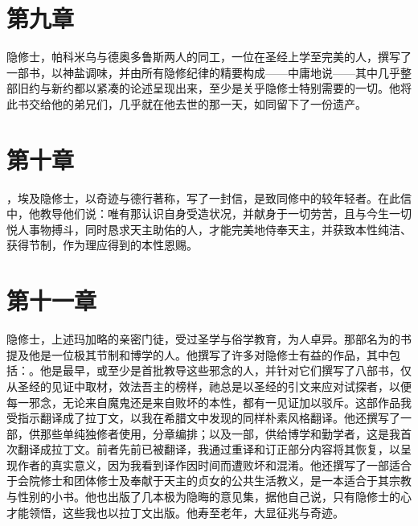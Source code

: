 
\section{第九章}

隐修士，帕科米乌与德奥多鲁斯两人的同工，一位在圣经上学至完美的人，撰写了一部书，以神盐调味，并由所有隐修纪律的精要构成——中庸地说——其中几乎整部旧约与新约都以紧凑的论述呈现出来，至少是关乎隐修士特别需要的一切。他将此书交给他的弟兄们，几乎就在他去世的那一天，如同留下了一份遗产。\par


\section{第十章}

，埃及隐修士，以奇迹与德行著称，写了一封信，是致同修中的较年轻者。在此信中，他教导他们说：唯有那认识自身受造状况，并献身于一切劳苦，且与今生一切悦人事物搏斗，同时恳求天主助佑的人，才能完美地侍奉天主，并获致本性纯洁、获得节制，作为理应得到的本性恩赐。\par


\section{第十一章}

隐修士，上述玛加略的亲密门徒，受过圣学与俗学教育，为人卓异。那部名为的书提及他是一位极其节制和博学的人。他撰写了许多对隐修士有益的作品，其中包括：。他是最早，或至少是首批教导这些邪念的人，并针对它们撰写了八部书，仅从圣经的见证中取材，效法吾主的榜样，祂总是以圣经的引文来应对试探者，以便每一邪念，无论来自魔鬼还是来自败坏的本性，都有一见证加以驳斥。这部作品我受指示翻译成了拉丁文，以我在希腊文中发现的同样朴素风格翻译。他还撰写了一部，供那些单纯独修者使用，分章编排；以及一部，供给博学和勤学者，这是我首次翻译成拉丁文。前者先前已被翻译，我通过重译和订正部分内容将其恢复，以呈现作者的真实意义，因为我看到译作因时间而遭败坏和混淆。他还撰写了一部适合于会院修士和团体修士及奉献于天主的贞女的公共生活教义，是一本适合于其宗教与性别的小书。他也出版了几本极为隐晦的意见集，据他自己说，只有隐修士的心才能领悟，这些我也以拉丁文出版。他寿至老年，大显征兆与奇迹。\par

